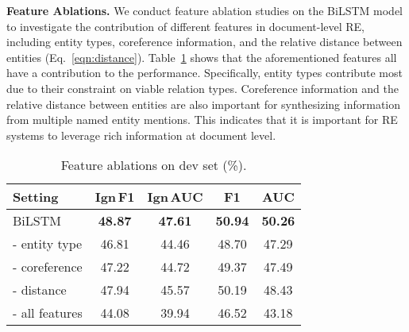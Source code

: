 \documentclass[11pt,a4paper]{article}
\begin{document}
\smallskip
\noindent
\textbf{Feature Ablations.}
We conduct feature ablation studies on the BiLSTM model to investigate the contribution of different features in document-level RE, including entity types, coreference information, and the relative distance between entities (Eq.~\ref{eqn:distance}). Table~\ref{tab:ablation} shows that the aforementioned features all have a contribution to the performance. Specifically, entity types contribute most due to their constraint on viable relation types. Coreference information and the relative distance between entities are also important for synthesizing information from multiple named entity mentions. This indicates that it is important for RE systems to leverage rich information at document level.




\begin{table}
\begin{center}
\small
\begin{tabular}{lcccc}
\toprule
Setting & Ign\,F1 &  Ign\,AUC & F1 & AUC \\
\midrule
BiLSTM & \textbf{48.87} & \textbf{47.61} & \textbf{50.94} & \textbf{50.26}  \\
\midrule
- entity type & 46.81& 44.46&48.70& 47.29\\
- coreference &  47.22 & 44.72 & 49.37& 47.49 \\
- distance & 47.94&  45.57& 50.19 & 48.43 \\
- all features & 44.08 & 39.94 & 46.52 & 43.18 \\
\bottomrule
\end{tabular}
\end{center}
\caption{Feature ablations on dev set (\%).}
\vspace{-0.5em}
\label{tab:ablation}
\end{table}
\end{document}
